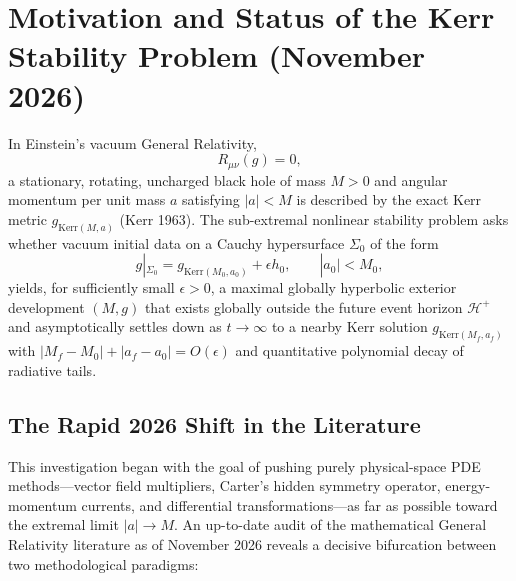 \documentclass[11pt, a4paper]{article}
\theoremstyle{remark}
\begin{document}
\begin{abstract}
\medskip
\noindent\textbf{Keywords:} Kerr black hole stability \textperiodcentered{} Carter Killing tensor \textperiodcentered{} physical-space Morawetz multiplier \textperiodcentered{} Riccati barrier \textperiodcentered{} Teukolsky--Regge--Wheeler hierarchy \textperiodcentered{} superradiance \textperiodcentered{} near-extremal throat \textperiodcentered{} symbolic verification
\end{abstract}

\newpage
\tableofcontents
\newpage

\section{Motivation and Status of the Kerr Stability Problem (November 2026)}
\label{sec:motivation}

In Einstein's vacuum General Relativity,
\begin{equation}
\label{eq:einstein}
R_{\mu\nu}(g) = 0,
\end{equation}
a stationary, rotating, uncharged black hole of mass $M > 0$ and angular momentum per unit mass $a$ satisfying $|a| < M$ is described by the exact Kerr metric $g_{\mathrm{Kerr}(M, a)}$ (Kerr 1963). The sub-extremal nonlinear stability problem asks whether vacuum initial data on a Cauchy hypersurface $\Sigma_0$ of the form
\begin{equation}
g|_{\Sigma_0} = g_{\mathrm{Kerr}(M_0, a_0)} + \epsilon h_0, \qquad |a_0| < M_0,
\end{equation}
yields, for sufficiently small $\epsilon > 0$, a maximal globally hyperbolic exterior development $(M, g)$ that exists globally outside the future event horizon $\mathcal{H}^+$ and asymptotically settles down as $t \to \infty$ to a nearby Kerr solution $g_{\mathrm{Kerr}(M_f, a_f)}$ with $|M_f - M_0| + |a_f - a_0| = O(\epsilon)$ and quantitative polynomial decay of radiative tails.

\subsection{The Rapid 2026 Shift in the Literature}

This investigation began with the goal of pushing purely physical-space PDE methods---vector field multipliers, Carter's hidden symmetry operator, energy-momentum currents, and differential transformations---as far as possible toward the extremal limit $|a| \to M$. An up-to-date audit of the mathematical General Relativity literature as of November 2026 reveals a decisive bifurcation between two methodological paradigms:
\end{document}
